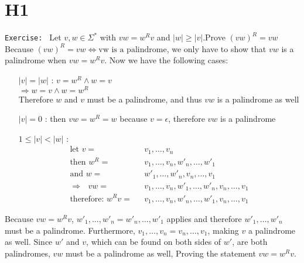 \documentclass[a4paper, 11pt]{article}
\begin{document}
    \section{H1}
    \texttt{Exercise: } Let $v,w \in \Sigma^*$ with $vw = w^{R}v$ and $|w|\geq |v|$.Prove $(vw)^R=vw$\\
    Because ${(vw)^R=vw}\Leftrightarrow{\mbox{vw is a palindrome}}$, we only have to show that $vw$ is 
    a palindrome when $vw = w^{R}v$. Now we have the following cases:
    \begin{itemize}[leftmargin=\dimexpr 26pt+.65in]
        \item[$|v|=|w|$ :] $v=w^R\land w=v$\\
                           $\Rightarrow w=v \land w=w^R$\\
                           Therefore $w$ and $v$ must be a palindrome, and thus $vw$ is a palindrome as well
        \item[$|v|=0$ :] then $vw = w^R = w$ because $v=\epsilon$, therefore $vw$ is a palindrome
        \item[$1\leq |v| < |w|$ :] 
        \begin{align*}
            \mbox{let } v=&\mbox{ }v_1,\dots,v_n\\
            \mbox{then } w^R=&\mbox{ }v_1,\dots,v_n,w'_n,\dots,w'_1\\
            \mbox{and } w=&\mbox{ }w'_1,\dots,w'_n,v_n,\dots,v_1\\
            \mbox{$\Rightarrow$ } vw=&\mbox{ } v_1,\dots,v_n,w'_1,\dots,w'_n,v_n,\dots,v_1\\
            \mbox{therefore: } w^{R}v=&\mbox{ }v_1,\dots,v_n,w'_n,\dots,w'_1,v_n,\dots,v_1
        \end{align*}
    \end{itemize}
    Because $vw=w^{R}v$, $w'_1,\dots,w'_n=w'_n,\dots,w'_1$ applies and therefore $w'_1,\dots,w'_n$ must be a palindrome.
    Furthermore, $v_1,\dots,v_n=v_n,\dots,v_1$, making $v$ a palindrome as well. Since $w'$ and $v$, which can be found 
    on both sides of $w'$, are both palindromes, $vw$ must be a palindrome as well, Proving the statement $vw=w^Rv$.
\end{document}
